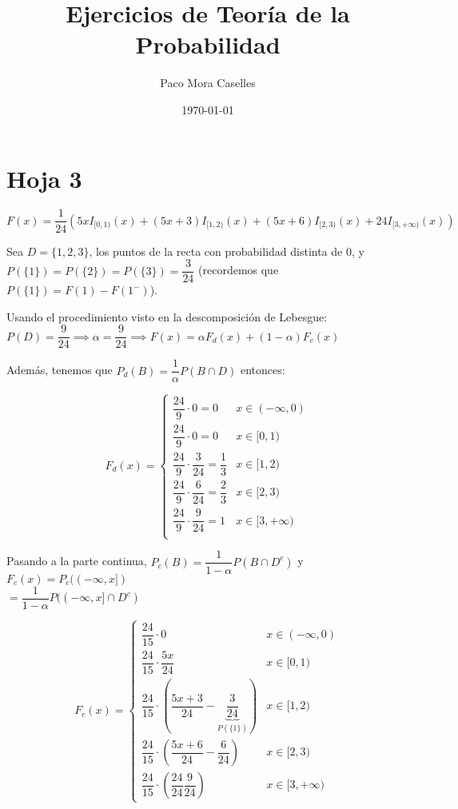 \documentclass[openany]{book}
\title{Ejercicios de Teoría de la Probabilidad}
\author{Paco Mora Caselles}
\date{\today}
\begin{document}
\maketitle



\chapter{Hoja 3}

\setcounter{ex}{2}

\begin{exercise}
    $$ F(x) = \frac{1}{24}(5xI_{[0,1)}(x)+(5x+3)I_{[1,2)}(x)+(5x+6)I_{[2,3)}(x)+24I_{[3,+\infty)}(x)) $$

    Sea $ D = \{1,2,3\} $, los puntos de la recta con probabilidad distinta de 0, y $ P(\{1\})  =P(\{2\}) = P(\{3\}) = \dfrac{3}{24} $ (recordemos que $ P(\{1\})  = F(1)-F(1^{-})$).

    Usando el procedimiento visto en la descomposición de Lebesgue: $ P(D) = \dfrac{9}{24}  \implies \alpha = \dfrac{9}{24} \implies F(x) = \alpha F_{d}(x) + (1-\alpha )F_{c}(x)$

    Además, tenemos que $ P_{d}(B) = \dfrac{1}{\alpha}P(B \cap D) $ entonces:

    $$ 
    F_{d}(x) = 
    \left\{
    \begin{array}{ll}
        \dfrac{24}{9} \cdot 0 = 0& x \in (- \infty ,0)\\
        \dfrac{24}{9} \cdot 0 = 0& x \in [0,1)\\
        \dfrac{24}{9} \cdot \dfrac{3}{24} = \dfrac{1}{3} & x \in [1,2)\\
        \dfrac{24}{9} \cdot \dfrac{6}{24} = \dfrac{2}{3} & x \in [2,3)\\
        \dfrac{24}{9} \cdot \dfrac{9}{24} = 1 & x \in [3,+\infty)\\

    \end{array}
    \right.
    $$

    Pasando a la parte continua, $ P_{c}(B) = \dfrac{1}{1- \alpha}P(B \cap D ^{c}) $ y $ F_{c}(x)=P_{c}((-\infty,x]) $\\$= \dfrac{1}{1-\alpha}P((-\infty,x]\cap D ^{c}) $

    $$ 
    F_{c}(x) = 
    \left\{
    \begin{array}{ll}
        \dfrac{24}{15} \cdot 0 & x \in (-\infty,0)\\
        \dfrac{24}{15} \cdot \dfrac{5x}{24} & x \in [0,1)\\
        \dfrac{24}{15} \cdot \left(\dfrac{5x+3}{24}-\underbrace{\dfrac{3}{24}}_{P(\{1\})}\right) & x \in [1,2)\\
        \dfrac{24}{15} \cdot \left(\dfrac{5x+6}{24}-\dfrac{6}{24}\right) & x \in [2,3)\\
        \dfrac{24}{15} \cdot \left(\dfrac{24}{24}\dfrac{9}{24}\right) & x \in [3,+\infty)
    \end{array}
    \right.
    $$


\end{exercise}
\end{document}
